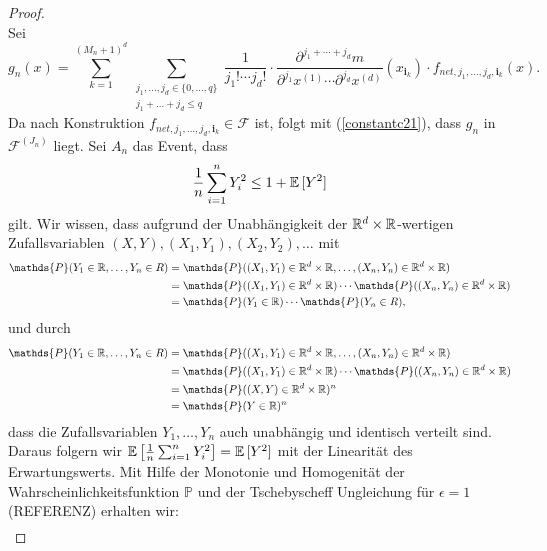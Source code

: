 \begin{proof}
\begin{equation}
\end{equation}
Sei 
$$g_n(x) = \sum_{k = 1}^{(M_n + 1)^d} \sum_{\substack{ j_1,\dots,j_d \in \{0,\dots,q\} \\j_1+\dots +j_d \leq q}} \frac{1}{j_1! \cdots j_d!} \cdot \frac{\partial^{j_1+\cdots + j_d} m}{\partial^{j_1} x^{(1)}\cdots \partial^{j_d} x^{(d)}}(x_{\mathbf{i}_k}) \cdot f_{net,j_1,\dots,j_d,\mathbf{i}_k}(x).$$
Da nach Konstruktion $f_{net,j_1,\dots,j_d,\mathbf{i}_k} \in \mathcal{F}$ ist, folgt mit (\ref{constantc21}), dass $g_n$ in $\mathcal{F}^{(J_n)}$ liegt. 
Sei $A_n$ das Event, dass 
\begin{equation}
\label{event}
\frac{1}{n} \sum_{i = 1}^n Y_i^2 \leq 1 + \mathbb{E}\,[Y^2]
\end{equation}
gilt.
Wir wissen, dass aufgrund der Unabhängigkeit der $\mathbb{R}^d \times \mathbb{R}$-wertigen Zufallsvariablen  $(X, Y), (X_1, Y_1), (X_2, Y_2), \dots$ mit 
\begin{equation*}
\begin{split}
\mathds{P}(Y_1 \in \R, \dots, Y_n \in R) & = \mathds{P}((X_1, Y_1) \in \R^d \times \R, \dots, (X_n, Y_n) \in \R^d \times \R) \\
& = \mathds{P}((X_1, Y_1) \in \R^d \times \R) \cdots \mathds{P}((X_n, Y_n) \in \R^d \times \R) \\
& = \mathds{P}(Y_1 \in \R) \cdots \mathds{P}(Y_n \in R) ,
\end{split}
\end{equation*}
und durch
\begin{equation*}
\begin{split}
\mathds{P}(Y_1 \in \R, \dots, Y_n \in R) & = \mathds{P}((X_1, Y_1) \in \R^d \times \R, \dots, (X_n, Y_n) \in \R^d \times \R) \\
& = \mathds{P}((X_1, Y_1) \in \R^d \times \R) \cdots \mathds{P}((X_n, Y_n) \in \R^d \times \R) \\
& = \mathds{P}((X, Y) \in \R^d \times \R)^n \\
& = \mathds{P}(Y \in \R)^n
\end{split}
\end{equation*}
dass die Zufallsvariablen $Y_1,\dots,Y_n$ auch unabhängig und identisch verteilt sind. Daraus folgern wir $\mathbb{E}\,\big[\frac{1}{n} \sum_{i = 1}^n Y_i^2\big] = \mathbb{E}\,[Y^2]$ mit der Linearität des Erwartungswerts.
Mit Hilfe der Monotonie und Homogenität der Wahrscheinlichkeitsfunktion $\mathds{P}$ und der Tschebyscheff Ungleichung für $\epsilon = 1$ (REFERENZ) erhalten wir:
\begin{equation}
\label{tscheby}
\begin{split}

\end{split}
\end{equation}
\end{proof}
